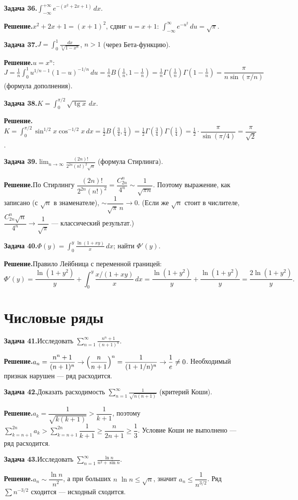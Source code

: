 \documentclass[10pt,a4paper]{article}
\DeclareMathOperator{\tg}{tg}
\newcommand{\dx}{\,dx}
\newcommand{\du}{\,du}
\renewcommand{\le}{\leqslant}
\renewcommand{\ge}{\geqslant}
\theoremstyle{definition}
\theoremstyle{plain}
\newcommand{\writespace}{\vspace{7.5mm}}
\newcommand{\task}[2]{%
  \par\writespace\noindent
  \textbf{\textcolor{accent}{Задача #1.}}\enspace #2\par\smallskip}
\newcommand{\sol}{\par\noindent\textbf{Решение.}\enspace}
\begin{document}
\task{36}{$\displaystyle\int_{-\infty}^{+\infty}e^{-(x^2+2x+1)}\dx$.}
\sol $x^2+2x+1=(x+1)^2$, сдвиг $u=x+1$: $\int_{-\infty}^\infty e^{-u^2}\du=\sqrt\pi$.

\task{37}{$\displaystyle J=\int_0^1\frac{dx}{\sqrt[n]{1-x^n}}$, $n>1$ (через Бета-функцию).}
\sol $u=x^n$: $J=\tfrac1n\int_0^1 u^{1/n-1}(1-u)^{-1/n}\du=\tfrac1n B(\tfrac1n,1-\tfrac1n)
=\tfrac1n\Gamma(\tfrac1n)\Gamma(1-\tfrac1n)=\dfrac{\pi}{n\sin(\pi/n)}$ (формула дополнения).

\task{38}{$\displaystyle K=\int_0^{\pi/2}\sqrt{\tg x}\dx$.}
\sol $K=\int_0^{\pi/2}\sin^{1/2}x\cos^{-1/2}x\dx=\tfrac12 B(\tfrac34,\tfrac14)
=\tfrac12\Gamma(\tfrac34)\Gamma(\tfrac14)=\tfrac12\cdot\dfrac{\pi}{\sin(\pi/4)}=\dfrac{\pi}{\sqrt2}$.

\task{39}{$\displaystyle\lim_{n\to\infty}\frac{(2n)!}{2^{2n}(n!)^2\sqrt n}$ (формула Стирлинга).}
\sol По Стирлингу $\dfrac{(2n)!}{2^{2n}(n!)^2}=\dfrac{C_{2n}^n}{4^n}\sim\dfrac1{\sqrt{\pi n}}$.
Поэтому выражение, как записано (с $\sqrt n$ в знаменателе), $\sim\dfrac1{\sqrt\pi\,n}\to0$. (Если же
$\sqrt n$ стоит в числителе, $\dfrac{C_{2n}^n\sqrt n}{4^n}\to\dfrac1{\sqrt\pi}$ — классический
результат.)

\task{40}{$\displaystyle\Phi(y)=\int_0^y\frac{\ln(1+xy)}{x}\dx$; найти $\Phi'(y)$.}
\sol Правило Лейбница с переменной границей:
\[
  \Phi'(y)=\frac{\ln(1+y^2)}{y}+\int_0^y\frac{x/(1+xy)}{x}\dx
  =\frac{\ln(1+y^2)}{y}+\frac{\ln(1+y^2)}{y}=\frac{2\ln(1+y^2)}{y}.
\]

\section{Числовые ряды}

\task{41}{Исследовать $\displaystyle\sum_{n=1}^\infty\frac{n^n+1}{(n+1)^n}$.}
\sol $a_n=\dfrac{n^n+1}{(n+1)^n}\to\Bigl(\dfrac{n}{n+1}\Bigr)^n=\dfrac1{(1+1/n)^n}\to\dfrac1e\ne0$.
Необходимый признак нарушен — ряд расходится.

\task{42}{Доказать расходимость $\displaystyle\sum_{n=1}^\infty\frac1{\sqrt{n(n+1)}}$ (критерий Коши).}
\sol $a_k=\dfrac1{\sqrt{k(k+1)}}>\dfrac1{k+1}$, поэтому
$\sum_{k=n+1}^{2n}a_k>\sum_{k=n+1}^{2n}\dfrac1{k+1}\ge\dfrac{n}{2n+1}\ge\dfrac13$. Условие Коши не
выполнено — ряд расходится.

\task{43}{Исследовать $\displaystyle\sum_{n=1}^\infty\frac{\ln n}{n^2+\sin n}$.}
\sol $a_n\sim\dfrac{\ln n}{n^2}$, а при больших $n$ $\ln n\le\sqrt n$, значит
$a_n\le\dfrac1{n^{3/2}}$. Ряд $\sum n^{-3/2}$ сходится — исходный сходится.
\end{document}
